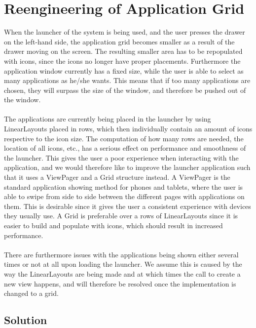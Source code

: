 
\section{Reengineering of Application Grid}
\label{sec:reengineering_of_application_grid}

When the launcher of the \giraf system is being used, and the user presses the drawer on the left-hand side, the application grid becomes smaller as a result of the drawer moving on the screen. The resulting smaller area has to be repopulated with icons, since the icons no longer have proper placements. Furthermore the application window currently has a fixed size, while the user is able to select as many applications as he/she wants. This means that if too many applications are chosen, they will surpass the size of the window, and therefore be pushed out of the window.
\\\\
The applications are currently being placed in the launcher by using LinearLayouts placed in rows, which then individually contain an amount of icons respective to the icon size. The computation of how many rows are needed, the location of all icons, etc., has a serious effect on performance and smoothness of the launcher. This gives the user a poor experience when interacting with the application, and we would therefore like to improve the launcher application such that it uses a ViewPager and a Grid structure instead. A ViewPager is the standard application showing method for phones and tablets, where the user is able to swipe from side to side between the different pages with applications on them. This is desirable since it gives the user a consistent experience with devices they usually use. A Grid is preferable over a rows of LinearLayouts since it is easier to build and populate with icons, which should result in increased performance. 
\\\\
There are furthermore issues with the applications being shown either several times or not at all upon loading the launcher. We assume this is caused by the way the LinearLayouts are being made and at which times the call to create a new view happens, and will therefore be resolved once the implementation is changed to a grid. 

\subsection{Solution} %
\label{sub:reengineering_of_application_grid_solution}

